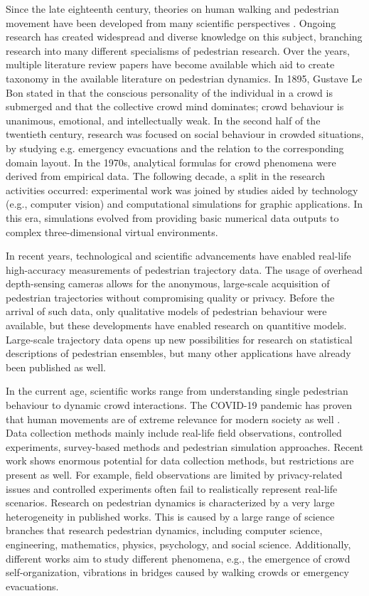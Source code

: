 \documentclass[class=article, crop=false]{standalone}
\begin{document}
Since the late eighteenth century, theories on human walking and pedestrian movement have been developed from many scientific perspectives \cite{science_walking}. 
Ongoing research has created widespread and diverse knowledge on this subject, branching research into many different specialisms of pedestrian research. 
Over the years, multiple literature review papers \cite{modelling_artificialped,crowdmotion_sota} have become available which aid to create taxonomy in the available literature on pedestrian dynamics.
In 1895, Gustave Le Bon stated in \cite{LeBon_mind} that the conscious personality of the individual in a crowd is submerged and that the collective crowd mind dominates; crowd behaviour is unanimous, emotional, and intellectually weak. 
In the second half of the twentieth century, research was focused on social behaviour in crowded situations, by studying e.g. emergency evacuations and the relation to the corresponding domain layout. 
In the 1970s, analytical formulas for crowd phenomena were derived from empirical data. 
The following decade, a split in the research activities occurred: experimental work was joined by studies aided by technology (e.g., computer vision) and computational simulations for graphic applications. 
In this era, simulations evolved from providing basic numerical data outputs to complex three-dimensional virtual environments.

In recent years, technological and scientific advancements have enabled real-life high-accuracy measurements of pedestrian trajectory data. 
The usage of overhead depth-sensing cameras \cite{Xovis} allows for the anonymous, large-scale acquisition of pedestrian trajectories without compromising quality or privacy. 
Before the arrival of such data, only qualitative models of pedestrian behaviour were available, but these developments have enabled research on quantitive models. 
Large-scale trajectory data opens up new possibilities for research on statistical descriptions of pedestrian ensembles, but many other applications have already been published \cite{CorbTosc_1,CorbTosc_2,CorbTosc_3} as well.

In the current age, scientific works range from understanding single pedestrian behaviour to dynamic crowd interactions. 
The COVID-19 pandemic has proven that human movements are of extreme relevance for modern society as well \cite{physical_distance}. 
Data collection methods mainly include real-life field observations, controlled experiments, survey-based methods and pedestrian simulation approaches. 
Recent work shows enormous potential for data collection methods, but restrictions are present as well. 
For example, field observations are limited by privacy-related issues and controlled experiments often fail to realistically represent real-life scenarios.
Research on pedestrian dynamics is characterized by a very large heterogeneity in published works. 
This is caused by a large range of science branches that research pedestrian dynamics, including computer science, engineering, mathematics, physics, psychology, and social science. 
Additionally, different works aim to study different phenomena, e.g., the emergence of crowd self-organization, vibrations in bridges caused by walking crowds or emergency evacuations.
\end{document}
